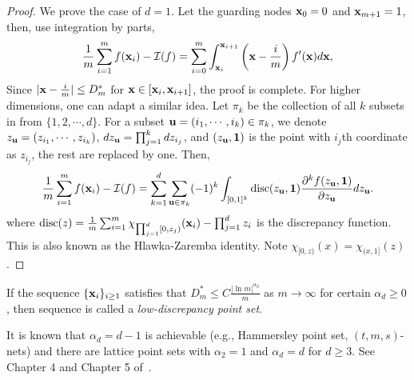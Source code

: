 \begin{proof}
    We prove the case of $d = 1$. Let the guarding nodes $\mathbf x_0 = 0$ and $\mathbf x_{m+1} = 1$, then, use integration by parts, 
    \begin{equation}
        \frac{1}{m} \sum_{i=1}^m f(\mathbf x_i) - \mathcal I(f) = \sum_{i=0}^m \int_{\mathbf x_i}^{\mathbf x_{i+1}} \left(\mathbf x - \frac{i}{m}\right) f'(\mathbf x) d \mathbf x,  
    \end{equation}
    Since $|\mathbf x - \frac{i}{m}|\le D^{\ast}_m$ for $\mathbf x \in [\mathbf x_i,\mathbf x_{i+1}]$, the proof is complete. For higher dimensions, one can adapt a similar idea. Let $\pi_k$ be the collection of all $k$ subsets in from $\{1,2,\cdots, d\}$. For a subset $\mathbf u = (i_1,\cdots, i_k)\in \pi_k$,  we denote $z_{\mathbf u} = (z_{i_1},\cdots, z_{i_k})$, $d z_{\mathbf u} = \prod_{j=1}^k d z_{i_j}$, and $(z_{\mathbf u}, {\bf {1}})$ is the point with $i_j$th coordinate as $z_{i_j}$, the rest are replaced by one. Then, 
    \begin{equation}
        \frac{1}{m} \sum_{i=1}^m f(\mathbf x_i) - \mathcal I(f) = \sum_{k=1}^d \sum_{\mathbf u\in \pi_k} (-1)^k \int_{[0, 1]^k} \textrm{disc}(z_{\mathbf u}, {\bf{1}}) \frac{\partial^k f(z_{\mathbf u}, {\bf{1}})}{\partial z_{\mathbf u}} d z_{\mathbf u}.    
    \end{equation}
    where $\textrm{disc}(z) = \frac{1}{m}\sum_{i=1}^m \chi_{\prod_{j=1}^d [0, z_j)}  (\mathbf x_{i}) - \prod_{j=1}^d z_i$ is the discrepancy function. This is also known as the Hlawka-Zaremba identity. Note $\chi_{[0, z)}(x) = \chi_{(x, 1]}(z)$.
\end{proof}
\begin{definition}
    If the sequence $\{\mathbf x_i\}_{i\ge 1}$ satisfies that
       $D_{m}^{\ast} \le C \frac{|\ln m|^{\alpha_d}}{m}$ as $m\to\infty$ for certain $\alpha_d \ge 0$, 
    then sequence is called a \emph{low-discrepancy point set}. 
\end{definition} 
It is known that $\alpha_d = d-1$ is achievable (e.g., Hammersley point set, $(t,m,s)$-nets) and there are lattice point sets with $\alpha_2 = 1$ and $\alpha_d = d$ for $d\ge 3$. See Chapter 4 and Chapter 5 of~\cite{niederreiter1992random}. 

\begin{example}
    
\end{example}

\begin{example}
    
\end{example}

